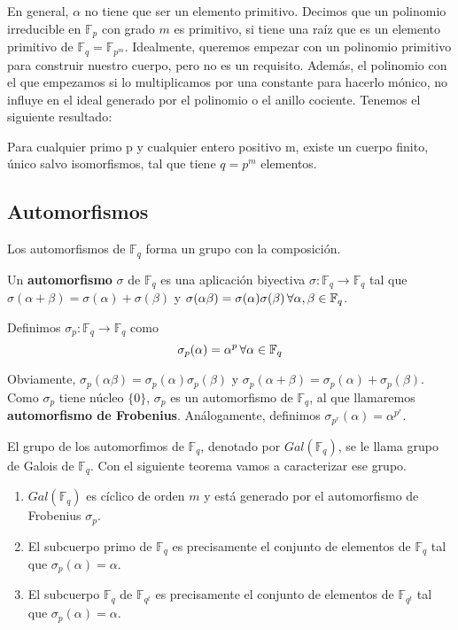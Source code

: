 En general, $\alpha$ no tiene que ser un elemento primitivo. Decimos que un polinomio irreducible en $\mathbb{F}_p$ con grado $m$ es primitivo, si tiene una raíz que es un elemento primitivo de $\mathbb{F}_q = \mathbb{F}_{p^m}$. Idealmente, queremos empezar con un polinomio primitivo para construir nuestro cuerpo, pero no es un requisito. Además, el polinomio con el que empezamos si lo multiplicamos por una constante para hacerlo mónico, no influye en el ideal generado por el polinomio o el anillo cociente. Tenemos el siguiente resultado:

\begin{theorem}
Para cualquier primo p y cualquier entero positivo m, existe un cuerpo finito, único salvo isomorfismos, tal que tiene $q = p^m$ elementos. 
\end{theorem}

\subsection{Automorfismos}


Los automorfismos de $\mathbb{F}_q$ forma un grupo con la composición.

\begin{definition}
Un \textbf{automorfismo} $\sigma$ de $\mathbb{F}_q$ es una aplicación biyectiva $\sigma : \mathbb{F}_q \rightarrow \mathbb{F}_q$ tal que $\sigma(\alpha+\beta) = \sigma(\alpha) + \sigma( \beta)$ y $\sigma(\alpha \beta) =\sigma(\alpha)\sigma(\beta) \thinspace \forall \alpha , \beta \in \mathbb{F}_q$. 

\end{definition}


Definimos $\sigma_p : \mathbb{F}_q \rightarrow \mathbb{F}_q$ como 
\[ 
\sigma_p (\alpha) = \alpha^p \thinspace \forall \alpha \in \mathbb{F}_q
\]

Obviamente, $\sigma_p(\alpha \beta) =\sigma_p(\alpha)\sigma_p(\beta)$ y $\sigma_p(\alpha+\beta) = \sigma_p(\alpha) + \sigma_p( \beta)$. Como $\sigma_p$ tiene núcleo $\{ 0 \}$, $\sigma_p$ es un automorfismo de $\mathbb{F}_q$, al que llamaremos \textbf{automorfismo de Frobenius}. Análogamente, definimos $\sigma_{p^r} (\alpha) = \alpha^{p^r}$.

El grupo de los automorfimos de $\mathbb{F}_q$, denotado por $Gal(\mathbb{F}_q)$, se le llama grupo de Galois de $\mathbb{F}_q$. Con el siguiente teorema vamos a caracterizar ese grupo.

\begin{theorem}
\begin{enumerate}
	\item $Gal(\mathbb{F}_q)$ es cíclico de orden $m$ y está generado por el automorfismo de Frobenius $\sigma_p$.
	\item El subcuerpo primo de $\mathbb{F}_q$ es precisamente el conjunto de elementos de $\mathbb{F}_q$ tal que $\sigma_p(\alpha) = \alpha$.
	\item El subcuerpo $\mathbb{F}_q$ de $\mathbb{F}_{q^t}$ es precisamente el conjunto de elementos de $\mathbb{F}_{q^t}$ tal que $\sigma_p(\alpha) = \alpha$.
\end{enumerate}
\end{theorem}

